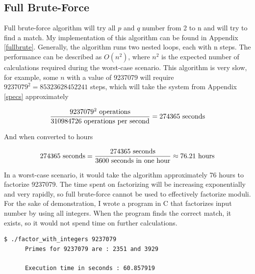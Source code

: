 \documentclass[a4paper, 12pt]{article}
\begin{document}
\subsection{Full Brute-Force}
\label{bsec:full}

Full brute-force algorithm will try all $p$ and $q$ number from 2 to n and will try to find a match. My
implementation of this algorithm can be found in Appendix \ref{fullbrute}. Generally, the algorithm runs two
nested loops, each with n steps. The performance can be described as $O(n^2)$, where $n^2$ is the
expected number of calculations required during the worst-case scenario.
This algorithm is very slow, for example, some $n$ with a value of
9237079 will require $9237079^2 = 85323628452241$ steps, which will take the system from
Appendix \ref{specs} approximately

\begin{equation*}
  \frac{9237079^2 \text{ operations}}{ 310984726 \text{ operations per second}} = 274365 \text{ seconds}\\
  \end{equation*}

And when converted to hours

\begin{equation*}
  274365 \text{ seconds}=\frac{274365 \text{ seconds}}{3600  \text{ seconds in one hour}} \approx 76.21 \text{ hours}\\
  \end{equation*}

In a worst-case scenario, it would take the algorithm approximately 76 hours to factorize 9237079. The time spent on factorizing
will be increasing exponentially and very rapidly, so full brute-force cannot be used to effectively factorize
moduli.\\

For the sake of demonstration, I wrote a program in C that factorizes input number by using all integers. When the program
finds the correct match, it exists, so it would not spend time on further calculations.\cite{github}

\begin{center}
\begin{lstlisting}[caption=Demonstration of Prime Factorization with Integers]
      $ ./factor_with_integers 9237079            
      Primes for 9237079 are : 2351 and 3929

      Execution time in seconds : 60.857919
  \end{lstlisting}
\end{center}
\end{document}
